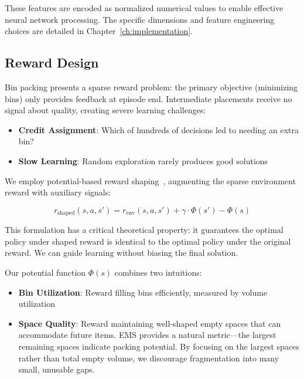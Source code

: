 These features are encoded as normalized numerical values to enable effective neural network processing. The specific dimensions and feature engineering choices are detailed in Chapter~\ref{ch:implementation}.

\subsection{Reward Design}
\label{sec:reward_shaping}

Bin packing presents a sparse reward problem: the primary objective (minimizing bins) only provides feedback at episode end. Intermediate placements receive no signal about quality, creating severe learning challenges:

\begin{itemize}
    \item \textbf{Credit Assignment}: Which of hundreds of decisions led to needing an extra bin?
    \item \textbf{Slow Learning}: Random exploration rarely produces good solutions
\end{itemize}

We employ potential-based reward shaping~\cite{ng1999policy}, augmenting the sparse environment reward with auxiliary signals:

\begin{equation}
r_{\text{shaped}}(s, a, s') = r_{\text{env}}(s, a, s') + \gamma \cdot \Phi(s') - \Phi(s)
\end{equation}

This formulation has a critical theoretical property: it guarantees the optimal policy under shaped reward is identical to the optimal policy under the original reward. We can guide learning without biasing the final solution.

Our potential function $\Phi(s)$ combines two intuitions:

\begin{itemize}
    \item \textbf{Bin Utilization}: Reward filling bins efficiently, measured by volume utilization
    \item \textbf{Space Quality}: Reward maintaining well-shaped empty spaces that can accommodate future items. EMS provides a natural metric---the largest remaining spaces indicate packing potential. By focusing on the largest spaces rather than total empty volume, we discourage fragmentation into many small, unusable gaps.
\end{itemize}

